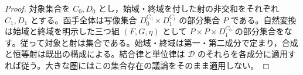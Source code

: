\documentclass[a5paper,10pt,dvipdfmx]{jsarticle}
\theoremstyle{definition}
\theoremstyle{plain}
\begin{document}
\begin{proof}
対象集合を $C_0,D_0$ とし，始域・終域を付した射の非交和をそれぞれ $C_1,D_1$ とする。函手全体は写像集合 $D_0^{C_0}\times D_1^{C_1}$ の部分集合 $P$ である。自然変換は始域と終域を明示した三つ組 $(F,G,\eta)$ として $P\times P\times D_1^{C_0}$ の部分集合をなす。従って対象と射は集合である。始域・終域は第一・第二成分で定まり，合成と恒等射は既出の構成による。結合律と単位律は $\mathcal D$ のそれらを各成分に適用すれば従う。大きな圏にはこの集合存在の議論をそのまま適用しない。
\end{proof}
\end{document}
